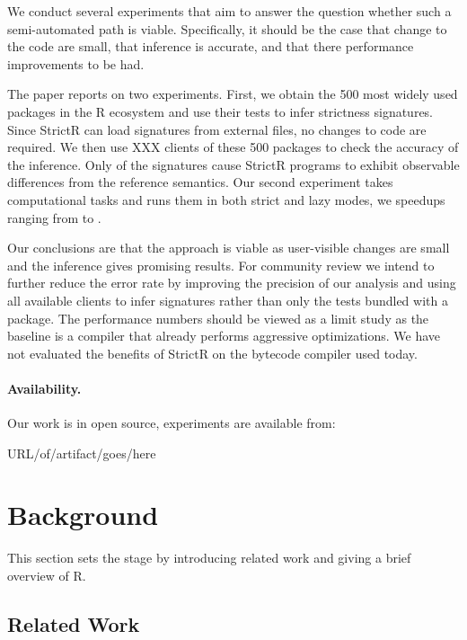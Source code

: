 \documentclass[review,creen,acmsmall]{acmart}
\newcommand{\strictr}{{\sf StrictR}\xspace}
\begin{document}
We conduct several experiments that aim to answer the question whether such a
semi-automated path is viable. Specifically, it should be the case that change
to the code are small, that inference is accurate, and that there performance
improvements to be had.

The paper reports on two experiments. First, we obtain the 500 most widely used
packages in the R ecosystem and use their tests to infer strictness signatures.
Since \strictr can load signatures from external files, no changes to code are
required. We then use XXX clients of these 500 packages to check the accuracy of
the inference. Only \robustnesResult of the signatures cause \strictr programs
to exhibit observable differences from the reference semantics. Our second
experiment takes computational tasks and runs them in both strict and lazy
modes, we speedups ranging from \speedupRshStrictMin to \speedupRshStrictMax.

Our conclusions are that the approach is viable as user-visible changes are
small and the inference gives promising results. For community review we intend
to further reduce the error rate by improving the precision of our analysis and
using all available clients to infer signatures rather than only the tests
bundled with a package. The performance numbers should be viewed as a limit
study as the baseline is a compiler that already performs aggressive
optimizations. We have not evaluated the benefits of \strictr on the bytecode
compiler used today.

\paragraph{Availability.} Our work is in open source,
  experiments are available from:\\

  \begin{center}
    URL/of/artifact/goes/here
\end{center}

\newpage
\section{Background}\label{sec:background}

This section sets the stage by introducing related work and giving a brief
overview of R.

\subsection{Related Work}
\end{document}

